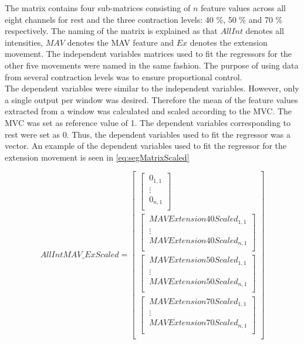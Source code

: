 The matrix contains four sub-matrices consisting of $n$ feature values across all eight channels for rest and the three contraction levels: 40 \%, 50 \% and 70 \% respectively. The naming of the matrix is explained as that $AllInt$ denotes all intensities, $MAV$ denotes the MAV feature and $Ex$ denotes the extension movement. The independent variables matrices used to fit the regressors for the other five movements were named in the same fashion. The purpose of using data from several contraction levels was to ensure proportional control. \\ 
The dependent variables were similar to the independent variables. However, only a single output per window was desired. Therefore the mean of the feature values extracted from a window was calculated and scaled according to the MVC. The MVC was set as reference value of 1. The dependent variables corresponding to rest were set as 0. Thus, the dependent variables used to fit the regressor was a vector. An example of the dependent variables used to fit the regressor for the extension movement is seen in \eqref{eq:segMatrixScaled}

\begin{equation} \label{eq:segMatrixScaled}
AllIntMAV\_ExScaled=\begin{bmatrix} 
\begin{bmatrix}
\ 0_{1,1} \\ 
\ \vdots \\
\ 0_{n,1}\\ \end{bmatrix} \\
\begin{bmatrix}
\ MAVExtension40Scaled_{1,1} \\ 
\ \vdots \\
\ MAVExtension40Scaled_{n,1}\\ \end{bmatrix} \\
\begin{bmatrix} 
\ MAVExtension50Scaled_{1,1} \\
\ \vdots \\
\ MAVExtension50Scaled_{n,1} \\ \end{bmatrix} \\
\begin{bmatrix} 
\ MAVExtension70Scaled_{1,1} \\
\ \vdots \\
\ MAVExtension70Scaled_{n,1}\\ \end{bmatrix} \\
\end{bmatrix}
\end{equation}

